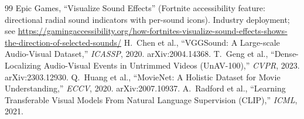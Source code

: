 \documentclass[11pt,a4paper]{article}
\begin{document}
\begin{thebibliography}{99}
 Epic Games, ``Visualize Sound Effects'' (Fortnite accessibility feature: directional radial sound indicators with per-sound icons). Industry deployment; see \url{https://gamingaccessibility.org/how-fortnites-visualize-sound-effects-shows-the-direction-of-selected-sounds/}
 H.\ Chen et al., ``VGGSound: A Large-scale Audio-Visual Dataset,'' \emph{ICASSP}, 2020. arXiv:2004.14368.
 T.\ Geng et al., ``Dense-Localizing Audio-Visual Events in Untrimmed Videos (UnAV-100),'' \emph{CVPR}, 2023. arXiv:2303.12930.
 Q.\ Huang et al., ``MovieNet: A Holistic Dataset for Movie Understanding,'' \emph{ECCV}, 2020. arXiv:2007.10937.
 A.\ Radford et al., ``Learning Transferable Visual Models From Natural Language Supervision (CLIP),'' \emph{ICML}, 2021.
\end{thebibliography}
\end{document}
